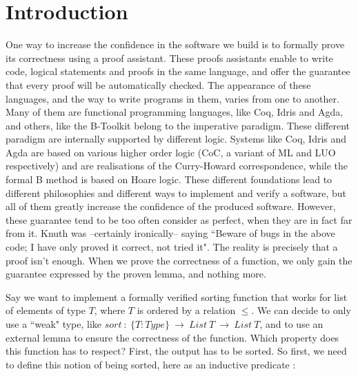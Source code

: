 \section{Introduction}


One way to increase the confidence in the software we build is to formally prove its correctness using a proof assistant. These proofs assistants enable to write code, logical statements and proofs in the same language, and offer the guarantee that every proof will be automatically checked. The appearance of these languages, and the way to write programs in them, varies from one to another. Many of them are functional programming languages, like Coq, Idris and Agda, and others, like the B-Toolkit belong to the imperative paradigm. These different paradigm are internally supported by different logic. Systems like Coq, Idris and Agda are based on various higher order logic (CoC, a variant of ML and LUO respectively) and are realisations of the Curry-Howard correspondence, while the formal B method is based on Hoare logic. These different foundations lead to different philosophies and different ways to implement and verify a software, but all of them greatly increase the confidence of the produced software. However, these guarantee tend to be too often consider as perfect, when they are in fact far from it. Knuth was --certainly ironically-- saying ``Beware of bugs in the above code; I have only proved it correct, not tried it". The reality is precisely that a proof isn't enough. When we prove the correctness of a function, we only gain the guarantee expressed by the proven lemma, and nothing more. 

Say we want to implement a formally verified sorting function that works for list of elements of type $T$, where $T$ is ordered by a relation $\leq$.
We can decide to only use a ``weak" type, like $sort\ :\ \{T:Type\}\ \rightarrow\ List\ T\ \rightarrow\ List\ T$, and to use an external lemma to ensure the correctness of the function. Which property does this function has to respect? First, the output has to be sorted. So first, we need to define this notion of being sorted, here as an inductive predicate :

